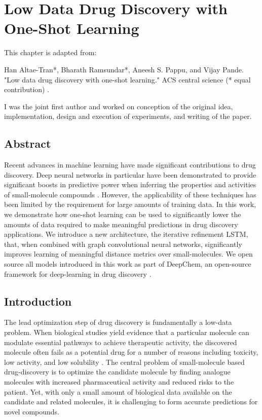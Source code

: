 \section{Low Data Drug Discovery with One-Shot Learning}

This chapter is adapted from: 

Han Altae-Tran*, Bharath Ramsundar*, Aneesh S. Pappu, and Vijay Pande. "Low data drug discovery with one-shot learning." ACS central science (* equal contribution) \cite{altae2017low}. 

I was the joint first author and worked on conception of the original idea, implementation, design and execution of experiments, and writing of the paper.

\subsection{Abstract}
Recent advances in machine learning have made significant contributions to drug discovery. Deep neural networks in particular have been demonstrated to provide significant boosts in predictive power when inferring the properties and activities of small-molecule compounds \cite{ma2015deep}. However, the applicability of these techniques has been limited by the requirement for large amounts of training data. In this work, we demonstrate how one-shot learning can be used to significantly lower the amounts of data required to make meaningful predictions in drug discovery applications. We introduce a new architecture, the iterative refinement LSTM, that, when combined with graph convolutional neural networks, significantly improves learning of meaningful distance metrics over small-molecules. We open source all models introduced in this work as part of DeepChem, an open-source framework for deep-learning in drug discovery
\cite{ram2016}.

\subsection{Introduction}
The lead optimization step of drug discovery is fundamentally a low-data problem. When biological studies yield evidence that a particular molecule can modulate essential pathways to achieve therapeutic activity, the discovered molecule often fails as a potential drug for a number of reasons including toxicity, low activity, and low solubility \cite{waring2015analysis}. The central problem of small-molecule based drug-discovery is to optimize the candidate molecule by finding analogue molecules with increased pharmaceutical activity and reduced risks to the patient. Yet, with only a small amount of biological data available on the candidate and related molecules, it is challenging to form accurate predictions for novel compounds.

